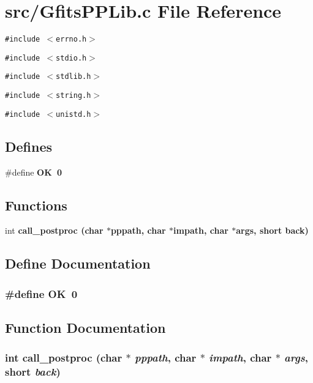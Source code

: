 \section{src/Gfits\-PPLib.c File Reference}
\label{GfitsPPLib_8c}
{\tt \#include $<$errno.h$>$}\par
{\tt \#include $<$stdio.h$>$}\par
{\tt \#include $<$stdlib.h$>$}\par
{\tt \#include $<$string.h$>$}\par
{\tt \#include $<$unistd.h$>$}\par
\subsection*{Defines}
\begin{CompactItemize}
\item 
\#define \bf{OK}~0
\end{CompactItemize}
\subsection*{Functions}
\begin{CompactItemize}
\item 
int \bf{call\_\-postproc} (char $\ast$pppath, char $\ast$impath, char $\ast$args, short back)
\end{CompactItemize}


\subsection{Define Documentation}
\subsubsection{\setlength{\rightskip}{0pt plus 5cm}\#define OK~0}\label{GfitsPPLib_8c_ba51915c87d64af47fb1cc59348961c9}




\subsection{Function Documentation}
\subsubsection{\setlength{\rightskip}{0pt plus 5cm}int call\_\-postproc (char $\ast$ {\em pppath}, char $\ast$ {\em impath}, char $\ast$ {\em args}, short {\em back})}\label{GfitsPPLib_8c_b67ca8073ef7434ada6f93e84f4b67ef}


